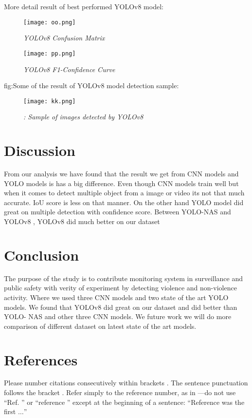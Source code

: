 \documentclass[conference]{IEEEtran}
\begin{document}
More detail result of best performed YOLOv8 model: 
\begin{figure}
    \centering
    \texttt{[image: oo.png]}
    \caption{\textit{YOLOv8 Confusion Matrix } }
    \label{fig:9}
\end{figure}
\begin{figure}
    \centering
    \texttt{[image: pp.png]}
    \caption{\textit{YOLOv8 F1-Confidence Curve } }
    \label{fig: 10}
\end{figure}
fig:Some of the result of YOLOv8 model detection sample: 
\begin{figure}
    \centering
    \texttt{[image: kk.png]}
    \caption{\textit{: Sample of images detected by YOLOv8 }
}
    \label{fig:11}
\end{figure}

\section{Discussion}
From our analysis we have found that the result we get from CNN models and YOLO models is has a big difference. Even though CNN models train well but when it comes to detect multiple object from a image or video its not that much accurate. IoU score is less on that manner. On the other hand YOLO model did great on multiple detection with confidence score. Between YOLO-NAS and YOLOv8 , YOLOv8 did much better on our dataset

\section{Conclusion}
The purpose of the study is to contribute monitoring system in surveillance and public safety with verity of experiment by detecting violence and non-violence activity. Where we used three CNN models and two state of the art YOLO models. We found that YOLOv8 did great on our dataset and did better than YOLO-
NAS and other three CNN models. We future work we will do more comparison of different dataset on latest state of the art models. 





\section*{References}

Please number citations consecutively within brackets \cite{b1}. The 
sentence punctuation follows the bracket \cite{b2}. Refer simply to the reference 
number, as in \cite{b3}---do not use ``Ref. \cite{b3}'' or ``reference \cite{b3}'' except at 
the beginning of a sentence: ``Reference \cite{b3} was the first $\ldots$''
\end{document}
